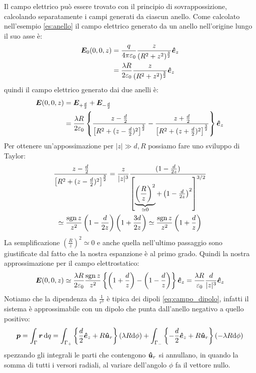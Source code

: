 \begin{Es}
  Il campo elettrico può essere trovato con il principio di sovrappossizione, calcolando separatamente i campi generati da ciascun anello. Come calcolato nell'esempio \ref{es:anello} il campo elettrico generato da un anello nell'origine lungo il suo asse è:
  \begin{align*}
    \boldsymbol{E}_0(0,0,z) & =\frac{q}{4\pi\varepsilon_0}\frac{z}{(R^2+z^2)^{\frac{3}{2}}}\boldsymbol{\hat {e}}_z      \\
                   & =\frac{\lambda R}{2\varepsilon_0}\frac{z}{(R^2+z^2)^{\frac{3}{2}}}\boldsymbol{\hat {e}}_z
  \end{align*}
  quindi il campo elettrico generato dai due anelli è:
  \begin{align*}
    \boldsymbol{E}(0,0,z) & =\boldsymbol{E}_{+\frac{d}{2}}+\boldsymbol{E}_{-\frac{d}{2}} \\
                 & =\frac{\lambda R}{2\varepsilon_0}\left\{
    \frac{z-\frac{d}{2}}{\left[R^2+(z-\frac{d}{2})^2\right]^{\frac{3}{2}}}
    -\frac{z+\frac{d}{2}}{\left[R^2+(z+\frac{d}{2})^2\right]^{\frac{3}{2}}}\right\}\boldsymbol{\hat {e}}_z
  \end{align*}
  Per ottenere un'appossimazione per $|z|\gg d,R$ possiamo fare uno sviluppo di Taylor:
  \begin{multline*}
    \frac{z-\frac{d}{2}}{\left[R^2+(z-\frac{d}{2})^2\right]^{\frac{3}{2}}}
    =\frac{z}{|z|^3}\frac{(1-\frac{d}{2z})}{\left[\underbrace{\left(\frac{R}{z}\right)^2}_{\simeq 0}+\left(1-\frac{d}{2z}\right)^2\right]^{3/2}}\\
    \simeq\frac{\operatorname{sgn}{z}}{z^2}\left(1-\frac{d}{2z}\right)\left(1+\frac{3d}{2z}\right)
    \simeq\frac{\operatorname{sgn}{z}}{z^2}\left(1+\frac{d}{z}\right)
  \end{multline*}
  La semplificazione $\left(\frac{R}{z}\right)^2\simeq 0$ e anche quella nell'ultimo passaggio sono giustificate dal fatto che la nostra espanzione è al primo grado. Quindi la nostra approssimazione per il campo elettrostatico:
  \[
    \boldsymbol{E}(0,0,z) \simeq \frac{\lambda R}{2\varepsilon_0}\frac{\operatorname{sgn}{z}}{z^2}\left\{\left(1+\frac{d}{z}\right)-\left(1-\frac{d}{z}\right)\right\}\boldsymbol{\hat {e}}_z
    = \frac{\lambda R}{\varepsilon_0}\frac{d}{|z|^3}\boldsymbol{\hat {e}}_z
  \]
  Notiamo che la dipendenza da $\frac{1}{r^3}$ è tipica dei dipoli \eqref{eq:campo_dipolo}, infatti il sistema è approssimabile con un dipolo che punta dall'anello negativo a quello positivo:
  \[
    \boldsymbol{p} = \int_\Gamma \boldsymbol{r}\,\mathrm{d} q = \int_{\Gamma_+} \left\{\frac{d}{2}\boldsymbol{\hat {e}}_z+R\boldsymbol{\hat {u}}_r\right\}\left(\lambda R\mathrm{d}\phi\right) + \int_{\Gamma_-} \left\{-\frac{d}{2}\boldsymbol{\hat {e}}_z+R\boldsymbol{\hat {u}}_r\right\}\left(-\lambda R\mathrm{d}\phi\right)
  \]
  spezzando gli integrali le parti che contengono $\boldsymbol{\hat {u}}_r$ si annullano, in quando la somma di tutti i versori radiali, al variare dell'angolo $\phi$ fa il vettore nullo.

\end{Es}
